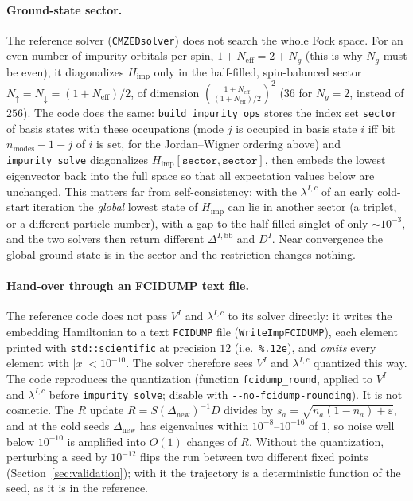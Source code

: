 \documentclass[11pt]{article}
\newcommand{\Neff}{N_{\mathrm{eff}}}
\newcommand{\Ng}{N_{g}}
\newcommand{\Himp}{H_{\mathrm{imp}}}
\begin{document}
\paragraph{Ground-state sector.} The reference solver (\texttt{CMZEDsolver})
does not search the whole Fock space. For an even number of impurity orbitals
per spin, $1+\Neff=2+\Ng$ (this is why $\Ng$ must be even), it diagonalizes
$\Himp$ only in the half-filled, spin-balanced sector
$N_\uparrow=N_\downarrow=(1+\Neff)/2$, of dimension
$\binom{1+\Neff}{(1+\Neff)/2}^2$ ($36$ for $\Ng=2$, instead of $256$). The code
does the same: \texttt{build\_impurity\_ops} stores the index set
\texttt{sector} of basis states with these occupations (mode $j$ is occupied
in basis state $i$ iff bit $n_{\mathrm{modes}}-1-j$ of $i$ is set, for the
Jordan--Wigner ordering above) and \texttt{impurity\_solve} diagonalizes
$\Himp[\texttt{sector},\texttt{sector}]$, then embeds the lowest eigenvector back
into the full space so that all expectation values below are unchanged.
This matters far from self-consistency: with the $\lambda^{I,c}$ of an early
cold-start iteration the \emph{global} lowest state of $\Himp$ can lie in
another sector (a triplet, or a different particle number), with a gap to the
half-filled singlet of only $\sim10^{-3}$, and the two solvers then return
different $\Delta^{I,\mathrm{bb}}$ and $D^{I}$. Near convergence the global
ground state is in the sector and the restriction changes nothing.

\paragraph{Hand-over through an FCIDUMP text file.} The reference code does
not pass $V^{I}$ and $\lambda^{I,c}$ to its solver directly: it writes the
embedding Hamiltonian to a text \texttt{FCIDUMP} file
(\texttt{WriteImpFCIDUMP}), each element printed with
\texttt{std::scientific} at precision $12$ (i.e.\ \texttt{\%.12e}), and
\emph{omits} every element with $\lvert x\rvert<10^{-10}$. The solver therefore
sees $V^I$ and $\lambda^{I,c}$ quantized this way. The code reproduces the
quantization (function \texttt{fcidump\_round}, applied to $V^I$ and
$\lambda^{I,c}$ before \texttt{impurity\_solve}; disable with
\texttt{-{}-no-fcidump-rounding}). It is not cosmetic. The $R$ update
$R=S(\Delta_{\mathrm{new}})^{-1}D$ divides by $s_a=\sqrt{n_a(1-n_a)+\varepsilon}$, and at
the cold seeds $\Delta_{\mathrm{new}}$ has eigenvalues within $10^{-8}$--$10^{-16}$
of $1$, so noise well below $10^{-10}$ is amplified into $O(1)$ changes of
$R$. Without the quantization, perturbing a seed by $10^{-12}$ flips the run
between two different fixed points (Section~\ref{sec:validation}); with it the
trajectory is a deterministic function of the seed, as it is in the reference.
\end{document}
